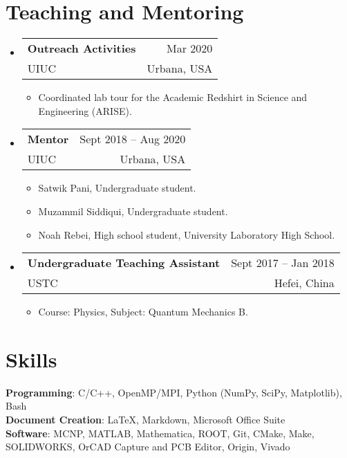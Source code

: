 \documentclass[letterpaper,11pt]{article} %
\makeatletter
\newcommand{\CVItem}[1]{
  \item\small{
    {#1 \vspace{-2pt}}
  }
}
\newcommand{\CVSubheading}[4]{
  \vspace{-2pt}\item
    \begin{tabular*}{0.97\textwidth}[t]{l@{\extracolsep{\fill}}r}
      \textbf{#1} & #2 \\
      \small#3 & \small #4 \\
    \end{tabular*}\vspace{-7pt}
}
\newcommand{\CVSubHeadingListStart}{\begin{itemize}[leftmargin=0.5cm, label={}]}
\newcommand{\CVSubHeadingListEnd}{\end{itemize}}
\newcommand{\CVItemListStart}{\begin{itemize}}
\newcommand{\CVItemListEnd}{\end{itemize}\vspace{-5pt}}
\makeatother
\begin{document}
\section{Teaching and Mentoring}
\CVSubHeadingListStart
    \CVSubheading
      {Outreach Activities}{Mar 2020}
      {UIUC}{Urbana, USA}
      \CVItemListStart
        \CVItem{Coordinated lab tour for the Academic Redshirt in Science and Engineering (ARISE).}
      \CVItemListEnd
    \CVSubheading
      {Mentor}{Sept 2018 – Aug 2020}
      {UIUC}{Urbana, USA}
      \CVItemListStart
        \CVItem{Satwik Pani, Undergraduate student.}
        \CVItem{Muzammil Siddiqui, Undergraduate student.}
        \CVItem{Noah Rebei, High school student, University Laboratory High School.}
      \CVItemListEnd
    \CVSubheading
      {Undergraduate Teaching Assistant}{Sept 2017 – Jan 2018}
      {USTC}{Hefei, China}
      \CVItemListStart
        \CVItem{Course: Physics, Subject: Quantum Mechanics B.}
      \CVItemListEnd
  \CVSubHeadingListEnd

\begin{comment}
This section is compressed from the various skills sections that Euro CV
recommends.
\end{comment}

\section{Skills}
 \begin{itemize}[leftmargin=0.5cm, label={}]
    {\item{
     \textbf{Programming}{: C/C++, OpenMP/MPI, Python (NumPy, SciPy, Matplotlib), Bash} \\
     \textbf{Document Creation}{: \LaTeX, Markdown, Microsoft Office Suite} \\
     \textbf{Software}{: MCNP, MATLAB, Mathematica, ROOT, Git, CMake, Make, SOLIDWORKS, OrCAD Capture and PCB Editor, Origin, Vivado}\\
    }}
 \end{itemize}


\end{document}
